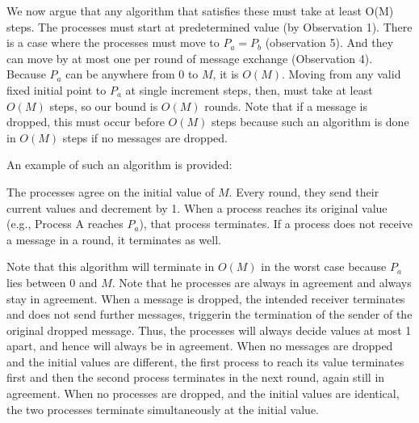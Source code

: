 \documentclass{article}
\begin{document}
We now argue that any algorithm that satisfies these must take at least O(M) steps. The processes  must start at predetermined value (by Observation 1). There is a case where the processes  must move to
$P_a = P_b$ (observation 5). And they can move by at most one per round of message exchange (Observation 4). Because $P_a$ can be anywhere from 0 to $M$, it is $O(M)$. Moving from
any valid fixed initial point to $P_a$ at single increment steps, then, must take at least $O(M)$ steps, so our bound is $O(M)$ rounds. Note that if a message is dropped, this must
occur before $O(M)$ steps because such an algorithm is done in $O(M)$ steps if no messages are dropped.

An example of such an algorithm is provided:

The processes agree on the initial value of $M$. Every round, they send their current values and decrement by 1. When a process reaches its original value (e.g., Process A reaches
$P_a$), that process terminates. If a process does not receive a message in a round, it terminates as well.

Note that this algorithm will terminate in $O(M)$ in the worst case because $P_a$ lies between 0 and $M$. Note that he processes are always in agreement and always stay in
agreement. When a message is dropped, the intended receiver terminates and does not send further messages, triggerin the termination of the sender of the original dropped message.
Thus, the processes will always decide values at most 1 apart, and hence will always be in agreement. When no messages are dropped and the initial values are different, the first process to reach its value terminates
first and then the second process terminates in the next round, again still in agreement. When no processes are dropped, and the initial values are identical, the two processes
terminate simultaneously at the initial value.
\end{document}
